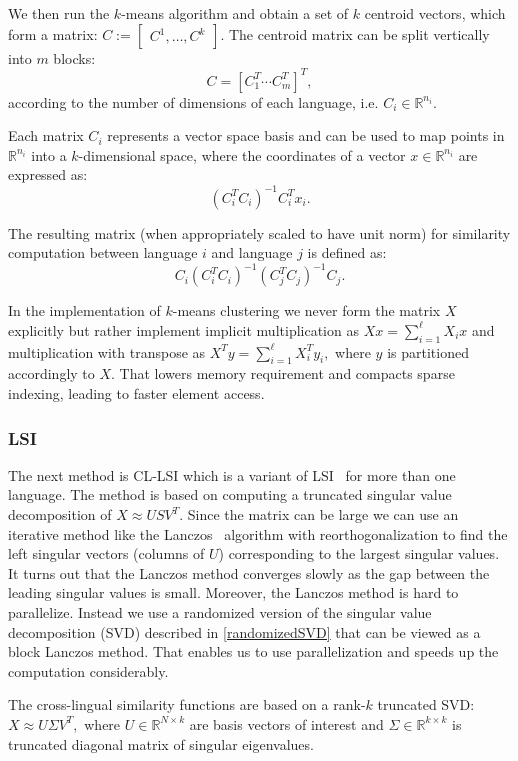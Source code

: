 \documentclass[twoside,11pt]{article}
\newcommand{\RR}{\mathbb{R}}
\begin{document}
We then run the $k$-means algorithm \cite{kmeans} and obtain a set of $k$ centroid vectors, which form a matrix: $C := \begin{bmatrix}C^1, \ldots, C^k \end{bmatrix}$. The centroid matrix can be split vertically into $m$ blocks: $$C = [C_1^T \cdots C_m^T]^T,$$ according to the number of dimensions of each language, i.e. $C_i \in \RR^{n_i}$.

Each matrix $C_i$ represents a vector space basis and can be used to map points in $\RR^{n_i}$ into a $k$-dimensional space, where the coordinates of a vector $x \in \RR^{n_i}$ are expressed as: $$(C_i^T C_i)^{-1} C_i^T x_i.$$

The resulting matrix (when appropriately scaled to have unit norm) for similarity computation between language $i$ and language $j$ is defined as:
$$C_i(C_i^T C_i)^{-1} (C_j^T C_j)^{-1} C_j.$$

In the implementation of $k$-means clustering we never form the matrix $X$ explicitly but rather implement implicit multiplication as $X x = \sum_{i=1}^\ell X_i x$ and multiplication with transpose as $X^T y = \sum_{i=1}^\ell X_i^T y_i,$ where $y$ is partitioned accordingly to $X$. That lowers memory requirement and compacts sparse indexing, leading to faster element access.

\subsubsection{LSI}

The next method is CL-LSI which is a variant of LSI~\cite{lsi} for more than one language. The method is based on computing a truncated singular value decomposition of $X \approx U S V^T$. Since the matrix can be large we can use an iterative method like the Lanczos~\cite{matrix_comp} algorithm with reorthogonalization to find the left singular vectors (columns of $U$) corresponding to the largest singular values. It turns out that the Lanczos method converges slowly as the gap between the leading singular values is small. Moreover, the Lanczos method is hard to parallelize. Instead we use a randomized version of the singular value decomposition (SVD) described in \ref{randomizedSVD} that can be viewed as a block Lanczos method. That enables us to use parallelization and speeds up the computation considerably.

The cross-lingual similarity functions are based on a rank-$k$ truncated SVD: $X \approx U \Sigma V^T,$ where $U \in \RR^{N \times k}$ are basis vectors of interest and $\Sigma \in \RR^{k \times k}$ is truncated diagonal matrix of singular eigenvalues.
\end{document}
